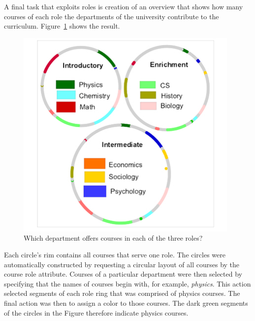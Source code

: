 A final task that exploits roles is creation of an overview that shows
how many courses of each role the departments of the university
contribute to the curriculum. Figure~\ref{fig:rolxCircles} shows the
result.
\begin{figure}
    \centering
    \includegraphics{Figs/rolxRingsCropped.pdf}
    \caption{Which department offers courses in each of the three roles?}
    \label{fig:rolxCircles}
\end{figure}
Each circle's rim contains all courses that serve one role. The
circles were automatically constructed by requesting a circular layout
of all courses by the course role attribute. Courses of a particular
department were then selected by specifying that the names of courses
begin with, for example, {\em physics}. This action selected segments
of each role ring that was comprised of physics courses. The final
action was then to assign a color to those courses. The dark green
segments of the circles in the Figure therefore indicate physics
courses.

